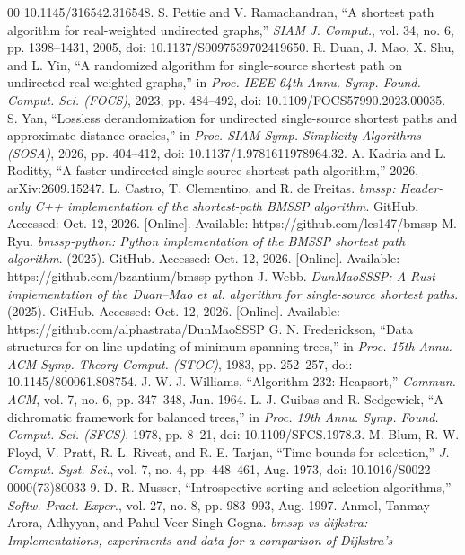 \documentclass[conference,a4paper]{IEEEtran}
\begin{document}
\begin{thebibliography}{00}
10.1145/316542.316548.
 S. Pettie and V. Ramachandran, ``A shortest path algorithm for
real-weighted undirected graphs,'' \emph{SIAM J. Comput.}, vol. 34, no. 6, pp. 1398--1431, 2005,
doi: 10.1137/S0097539702419650.
 R. Duan, J. Mao, X. Shu, and L. Yin, ``A randomized algorithm for
single-source shortest path on undirected real-weighted graphs,'' in \emph{Proc. IEEE 64th Annu.
Symp. Found. Comput. Sci. (FOCS)}, 2023, pp. 484--492, doi: 10.1109/FOCS57990.2023.00035.
 S. Yan, ``Lossless derandomization for undirected single-source shortest paths
and approximate distance oracles,'' in \emph{Proc. SIAM Symp. Simplicity Algorithms (SOSA)},
2026, pp. 404--412, doi: 10.1137/1.9781611978964.32.
 A. Kadria and L. Roditty, ``A faster undirected single-source shortest path
algorithm,'' 2026, arXiv:2609.15247.
 L. Castro, T. Clementino, and R. de Freitas. \emph{bmssp: Header-only C++
implementation of the shortest-path BMSSP algorithm}. GitHub. Accessed: Oct. 12, 2026. [Online].
Available: https://github.com/lcs147/bmssp
 M. Ryu. \emph{bmssp-python: Python implementation of the BMSSP shortest path
algorithm}. (2025). GitHub. Accessed: Oct. 12, 2026. [Online]. Available:
https://github.com/bzantium/bmssp-python
 J. Webb. \emph{DunMaoSSSP: A Rust implementation of the Duan--Mao et al.
algorithm for single-source shortest paths}. (2025). GitHub. Accessed: Oct. 12, 2026. [Online].
Available: https://github.com/alphastrata/DunMaoSSSP
 G. N. Frederickson, ``Data structures for on-line updating of minimum
spanning trees,'' in \emph{Proc. 15th Annu. ACM Symp. Theory Comput. (STOC)}, 1983, pp.
252--257, doi: 10.1145/800061.808754.
 J. W. J. Williams, ``Algorithm 232: Heapsort,'' \emph{Commun. ACM}, vol.
7, no. 6, pp. 347--348, Jun. 1964.
 L. J. Guibas and R. Sedgewick, ``A dichromatic framework for balanced
trees,'' in \emph{Proc. 19th Annu. Symp. Found. Comput. Sci. (SFCS)}, 1978, pp. 8--21, doi:
10.1109/SFCS.1978.3.
 M. Blum, R. W. Floyd, V. Pratt, R. L. Rivest, and R. E. Tarjan, ``Time bounds
for selection,'' \emph{J. Comput. Syst. Sci.}, vol. 7, no. 4, pp. 448--461, Aug. 1973, doi:
10.1016/S0022-0000(73)80033-9.
 D. R. Musser, ``Introspective sorting and selection algorithms,''
\emph{Softw. Pract. Exper.}, vol. 27, no. 8, pp. 983--993, Aug. 1997.
 Anmol, Tanmay Arora, Adhyyan, and Pahul Veer Singh Gogna.
\emph{bmssp-vs-dijkstra: Implementations, experiments and data for a comparison of Dijkstra's
}
\end{thebibliography}
\end{document}
